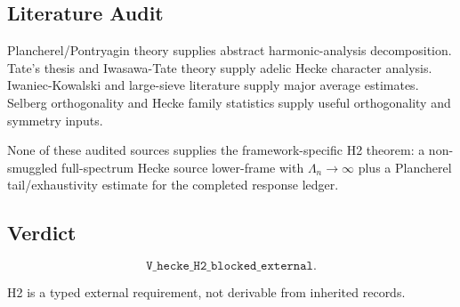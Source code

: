 \subsection*{Literature Audit}

Plancherel/Pontryagin theory supplies abstract harmonic-analysis decomposition. Tate's thesis and Iwasawa-Tate theory supply adelic Hecke character analysis. Iwaniec-Kowalski and large-sieve literature supply major average estimates. Selberg orthogonality and Hecke family statistics supply useful orthogonality and symmetry inputs.

None of these audited sources supplies the framework-specific H2 theorem: a non-smuggled full-spectrum Hecke source lower-frame with $\Lambda_n\to\infty$ plus a Plancherel tail/exhaustivity estimate for the completed response ledger.

\subsection*{Verdict}

\[
\texttt{V\_hecke\_H2\_blocked\_external}.
\]

H2 is a typed external requirement, not derivable from inherited records.
